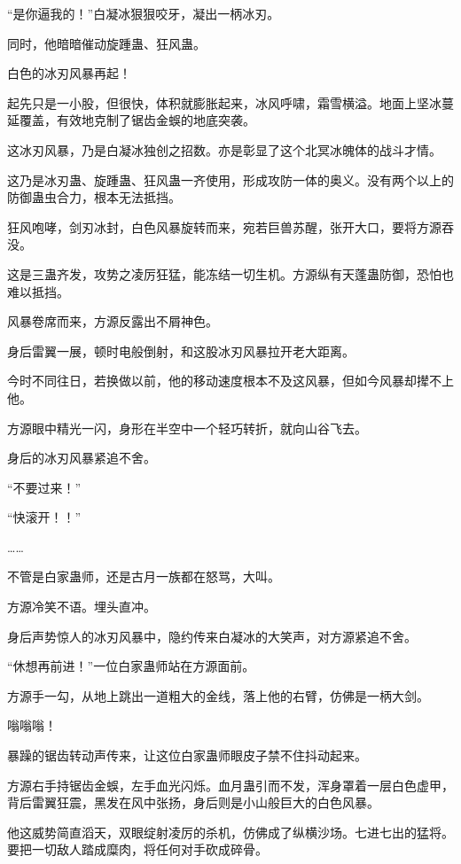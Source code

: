 
\begin{this_body}

“是你逼我的！”白凝冰狠狠咬牙，凝出一柄冰刃。

同时，他暗暗催动旋踵蛊、狂风蛊。

白色的冰刃风暴再起！

起先只是一小股，但很快，体积就膨胀起来，冰风呼啸，霜雪横溢。地面上坚冰蔓延覆盖，有效地克制了锯齿金蜈的地底突袭。

这冰刃风暴，乃是白凝冰独创之招数。亦是彰显了这个北冥冰魄体的战斗才情。

这乃是冰刃蛊、旋踵蛊、狂风蛊一齐使用，形成攻防一体的奥义。没有两个以上的防御蛊虫合力，根本无法抵挡。

狂风咆哮，剑刃冰封，白色风暴旋转而来，宛若巨兽苏醒，张开大口，要将方源吞没。

这是三蛊齐发，攻势之凌厉狂猛，能冻结一切生机。方源纵有天蓬蛊防御，恐怕也难以抵挡。

风暴卷席而来，方源反露出不屑神色。

身后雷翼一展，顿时电般倒射，和这股冰刃风暴拉开老大距离。

今时不同往日，若换做以前，他的移动速度根本不及这风暴，但如今风暴却撵不上他。

方源眼中精光一闪，身形在半空中一个轻巧转折，就向山谷飞去。

身后的冰刃风暴紧追不舍。

“不要过来！”

“快滚开！！”

……

不管是白家蛊师，还是古月一族都在怒骂，大叫。

方源冷笑不语。埋头直冲。

身后声势惊人的冰刃风暴中，隐约传来白凝冰的大笑声，对方源紧追不舍。

“休想再前进！”一位白家蛊师站在方源面前。

方源手一勾，从地上跳出一道粗大的金线，落上他的右臂，仿佛是一柄大剑。

嗡嗡嗡！

暴躁的锯齿转动声传来，让这位白家蛊师眼皮子禁不住抖动起来。

方源右手持锯齿金蜈，左手血光闪烁。血月蛊引而不发，浑身罩着一层白色虚甲，背后雷翼狂震，黑发在风中张扬，身后则是小山般巨大的白色风暴。

他这威势简直滔天，双眼绽射凌厉的杀机，仿佛成了纵横沙场。七进七出的猛将。要把一切敌人踏成糜肉，将任何对手砍成碎骨。


\end{this_body}
